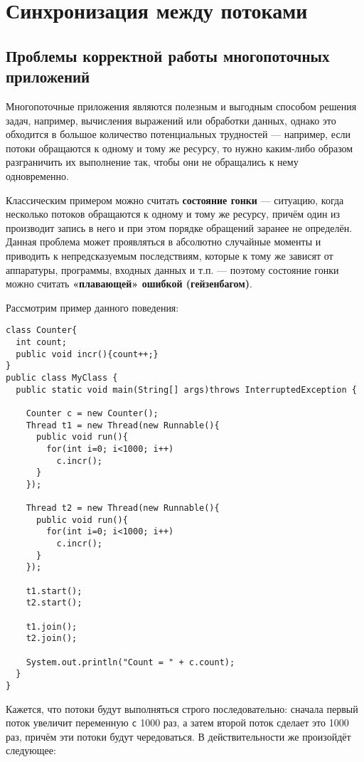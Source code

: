 \chapter{Синхронизация между потоками}

\section{Проблемы корректной работы многопоточных приложений}

Многопоточные приложения являются полезным и выгодным способом решения задач, например, вычисления выражений или обработки данных, однако это обходится в большое количество потенциальных трудностей — например, если потоки обращаются к одному и тому же ресурсу, то нужно каким-либо образом разграничить их выполнение так, чтобы они не обращались к нему одновременно.

Классическим примером можно считать \textbf{состояние гонки} — ситуацию, когда несколько потоков обращаются к одному и тому же ресурсу, причём один из производит запись в него и при этом порядке обращений заранее не определён. Данная проблема может проявляться в абсолютно случайные моменты и приводить к непредсказуемым последствиям, которые к тому же зависят от аппаратуры, программы, входных данных и т.п. — поэтому состояние гонки можно считать \textbf{«плавающей» ошибкой (гейзенбагом)}.

Рассмотрим пример данного поведения:

\begin{lstlisting}
class Counter{
  int count;
  public void incr(){count++;}
}
public class MyClass {
  public static void main(String[] args)throws InterruptedException {

    Counter c = new Counter();
    Thread t1 = new Thread(new Runnable(){
      public void run(){
        for(int i=0; i<1000; i++)
          c.incr();
      }
    });

    Thread t2 = new Thread(new Runnable(){
      public void run(){
        for(int i=0; i<1000; i++)
          c.incr();
      }
    });

    t1.start();
    t2.start();

    t1.join();
    t2.join();
    
    System.out.println("Count = " + c.count);
  }
}
\end{lstlisting}

Кажется, что потоки будут выполняться строго последовательно: сначала первый поток увеличит переменную \verb|c| 1000 раз, а затем второй поток сделает это 1000 раз, причём эти потоки будут чередоваться. В действительности же произойдёт следующее:

